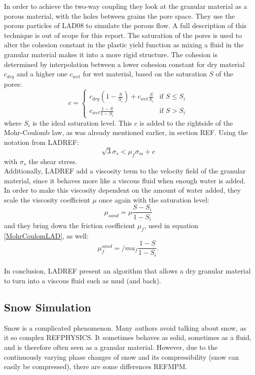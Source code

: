 In order to achieve the two-way coupling they look at the granular material as a porous material, with the holes between grains the pore space. They use the porous particles of LAD08 to simulate the porous flow. A full description of this technique is out of scope for this report. The saturation of the pores is used to alter the cohesion constant in the plastic yield function as mixing a fluid in the granular material makes it into a more rigid structure. The cohesion is determined by interpolation between a lower cohesion constant for dry material $c_{dry}$ and a higher one $c_{wet}$ for wet material, based on the saturation $S$ of the pores:
\begin{equation}
c =
\left\{
	\begin{array}{ll}
		c_{dry} (1 - \frac{S}{S_i}) + c_{wet} \frac{S}{S_i}  & \mbox{if } S \leq S_i \\
		c_{wet} \frac{1 - S}{1 - S_i} & \mbox{if } S > S_i
	\end{array}
\right.
\end{equation}
where $S_i$ is the ideal saturation level. This $c$ is added to the rightside of the Mohr-Coulomb law, as was already mentioned earlier, in section REF. Using the notation from LADREF: 
\begin{equation} \label{MohrCoulomdLAD}
\sqrt{3} \sigma_s < \mu_f \sigma_m + c
\end{equation}
with $\sigma_s$ the shear stress.\\

Additionally, LADREF add a viscosity term to the velocity field of the granular material, since it behaves more like a viscous fluid when enough water is added. In order to make this viscosity dependent on the amount of water added, they scale the viscosity coefficient $\mu$ once again with the saturation level:
\begin{equation}
\mu_{sand} = \mu \frac{S - S_i}{1 - S_i} 
\end{equation}
and they bring down the friction coefficient $\mu_f$, used in equation \eqref{MohrCoulomLAD}, as well:
\begin{equation}
\mu_f^{sand} = /mu_f \frac{1 - S}{1 - S_i}.
\end{equation}
\\
In conclusion, LADREF present an algorithm that allows a dry granular material to turn into a viscous fluid such as mud (and back).

\subsection{Snow Simulation} \label{sec_mpm}
Snow is a complicated phenomenon. Many authors avoid talking about snow, as it so complex REFPHYSICS. It sometimes behaves as solid, sometimes as a fluid, and is therefore often seen as a granular material. However, due to the continuously varying phase changes of snow and its compressibility (snow can easily be compressed), there are some differences REFMPM.\\

